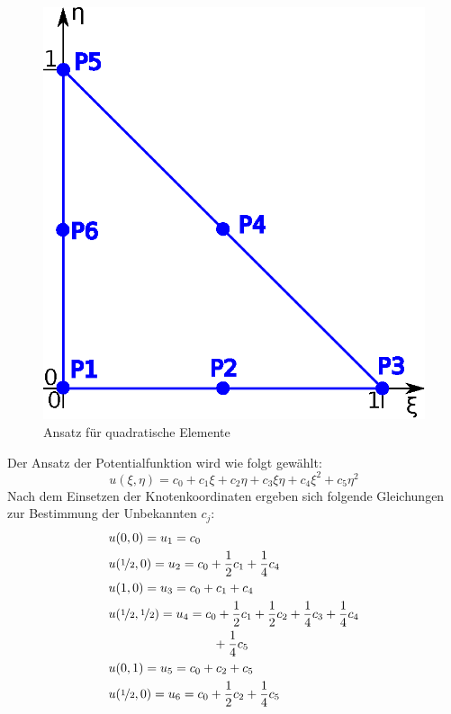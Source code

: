 \begin{figure}
	\begin{center}
		\includegraphics[scale=0.65]{pics/quadratic_element.eps}
	\end{center}
	\caption{Ansatz für quadratische Elemente}
	\label{fig:quadratic_element}
\end{figure}

Der Ansatz der Potentialfunktion wird wie folgt gewählt:
\begin{equation}
\label{eq:quadratic_triangle_eq}
u(\xi, \eta) = c_0 + c_1 \xi + c_2 \eta + c_3 \xi \eta + c_4 \xi^2 + c_5 \eta^2
\end{equation}	
Nach dem Einsetzen der Knotenkoordinaten ergeben sich folgende Gleichungen zur Bestimmung der Unbekannten $c_j$:
\begin{align}
&u(0,0) = u_1 = c_0\\
&u(\nicefrac{1}{2}, 0) = u_2 = c_0 + \frac{1}{2} c_1 + \frac{1}{4} c_4 \nonumber \\
&u(1, 0) = u_3 = c_0 + c_1 + c_4 \nonumber \\
&u(\nicefrac{1}{2}, \nicefrac{1}{2}) = u_4 = c_0 + \frac{1}{2} c_1 + \frac{1}{2} c_2 + \frac{1}{4} c_3 + \frac{1}{4} c_4  \nonumber \\ 
&\quad \quad \quad \quad \quad \quad \quad \quad \ +\frac{1}{4} c_5\nonumber \\
&u(0, 1) = u_5 = c_0 + c_2 + c_5 \nonumber \\
&u(\nicefrac{1}{2}, 0) = u_6 = c_0 + \frac{1}{2} c_2 + \frac{1}{4} c_5 \nonumber
\end{align}		


